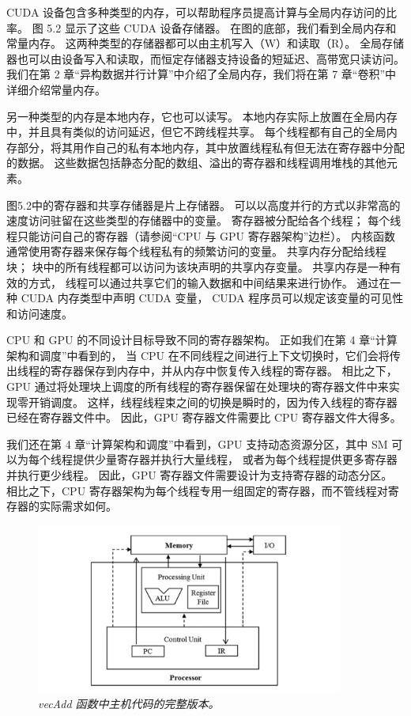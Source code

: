 CUDA 设备包含多种类型的内存，可以帮助程序员提高计算与全局内存访问的比率。 图 5.2 显示了这些 CUDA 设备存储器。 
在图的底部，我们看到全局内存和常量内存。 这两种类型的存储器都可以由主机写入（W）和读取（R）。 
全局存储器也可以由设备写入和读取，而恒定存储器支持设备的短延迟、高带宽只读访问。 
我们在第 2 章“异构数据并行计算”中介绍了全局内存，我们将在第 7 章“卷积”中详细介绍常量内存。

另一种类型的内存是本地内存，它也可以读写。 本地内存实际上放置在全局内存中，并且具有类似的访问延迟，但它不跨线程共享。 
每个线程都有自己的全局内存部分，将其用作自己的私有本地内存，其中放置线程私有但无法在寄存器中分配的数据。 
这些数据包括静态分配的数组、溢出的寄存器和线程调用堆栈的其他元素。

图5.2中的寄存器和共享存储器是片上存储器。 可以以高度并行的方式以非常高的速度访问驻留在这些类型的存储器中的变量。 
寄存器被分配给各个线程； 每个线程只能访问自己的寄存器（请参阅“CPU 与 GPU 寄存器架构”边栏）。 
内核函数通常使用寄存器来保存每个线程私有的频繁访问的变量。 共享内存分配给线程块； 
块中的所有线程都可以访问为该块声明的共享内存变量。 共享内存是一种有效的方式，
线程可以通过共享它们的输入数据和中间结果来进行协作。 通过在一种 CUDA 内存类型中声明 CUDA 变量，
CUDA 程序员可以规定该变量的可见性和访问速度。

\begin{remark}
CPU 和 GPU 的不同设计目标导致不同的寄存器架构。 正如我们在第 4 章“计算架构和调度”中看到的，
当 CPU 在不同线程之间进行上下文切换时，它们会将传出线程的寄存器保存到内存中，并从内存中恢复传入线程的寄存器。 
相比之下，GPU 通过将处理块上调度的所有线程的寄存器保留在处理块的寄存器文件中来实现零开销调度。 
这样，线程线程束之间的切换是瞬时的，因为传入线程的寄存器已经在寄存器文件中。 
因此，GPU 寄存器文件需要比 CPU 寄存器文件大得多。

我们还在第 4 章“计算架构和调度”中看到，GPU 支持动态资源分区，其中 SM 可以为每个线程提供少量寄存器并执行大量线程，
或者为每个线程提供更多寄存器并执行更少线程。 因此，GPU 寄存器文件需要设计为支持寄存器的动态分区。 
相比之下，CPU 寄存器架构为每个线程专用一组固定的寄存器，而不管线程对寄存器的实际需求如何。
\end{remark}

\begin{figure}[H]
	\centering
	\includegraphics[width=0.9\textwidth]{figs/F5.3.png}
	\caption{\textit{\color{red} vecAdd 函数中主机代码的完整版本。}}
\end{figure}


